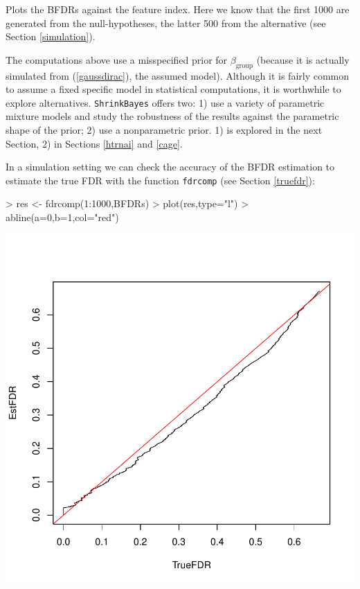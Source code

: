 \documentclass[11pt]{article}
\newcommand{\para}{\bigskip\noindent}
\begin{document}
\noindent
Plots the BFDRs against the feature index. Here we know that the first 1000 are generated from
the null-hypotheses, the latter 500 from the alternative (see Section \ref{simulation}).



\para
The computations above use a misspecified prior for $\beta_{\text{group}}$ (because it is actually simulated from
(\ref{gaussdirac}), the assumed model). Although it is fairly common to assume a fixed specific model in statistical computations,
it is worthwhile to explore alternatives. {\tt ShrinkBayes} offers two: 1) use a variety of parametric mixture models and study the robustness of the results
against the parametric shape of the prior; 2) use a nonparametric prior.
1) is explored in the next Section, 2) in Sections \ref{htrnai} and \ref{cage}.


In a simulation setting we can check the accuracy of the BFDR estimation to estimate the true FDR with the function {\tt fdrcomp}
(see Section \ref{truefdr}):

\begin{Schunk}
\begin{Sinput}
> res <- fdrcomp(1:1000,BFDRs)
> plot(res,type="l")
> abline(a=0,b=1,col="red")
\end{Sinput}
\end{Schunk}
\includegraphics{ShrinkBayes-025}
\end{document}
